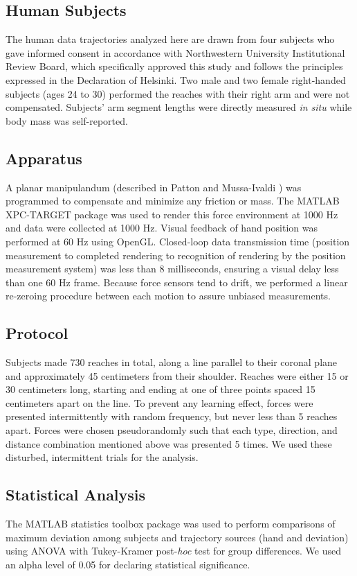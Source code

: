 \documentclass[10pt]{article}
\begin{document}
\subsection*{Human Subjects}
The human data trajectories analyzed here are drawn from four subjects who gave informed consent in accordance with Northwestern University Institutional Review Board, which specifically approved this study and follows the principles expressed in the Declaration of Helsinki. Two male and two female right-handed subjects (ages 24 to 30) performed the reaches with their right arm and were not compensated. Subjects' arm segment lengths were directly measured \textit{in situ} while body mass was self-reported. 

\subsection*{Apparatus}
A planar manipulandum (described in Patton and Mussa-Ivaldi \cite{patton2004robot}) was programmed to compensate and minimize any friction or mass. The MATLAB XPC-TARGET package \cite{MATLAB:2008} was used to render this force environment at 1000 Hz and data were collected at 1000 Hz.  Visual feedback of hand position was performed at 60 Hz using OpenGL. Closed-loop data transmission time (position measurement to completed rendering to recognition of rendering by the position measurement system) was less than 8 milliseconds, ensuring a visual delay less than one 60 Hz frame. Because force sensors tend to drift, we performed a linear re-zeroing procedure between each motion to assure unbiased measurements. 

\subsection*{Protocol}
Subjects made 730 reaches in total, along a line parallel to their coronal plane and approximately 45 centimeters from their shoulder. Reaches were either 15 or 30 centimeters long, starting and ending at one of three points spaced 15 centimeters apart on the line. To prevent any learning effect, forces were presented intermittently with random frequency, but never less than 5 reaches apart. Forces were chosen pseudorandomly such that each type, direction, and distance combination mentioned above was presented 5 times. We used these disturbed, intermittent trials for the analysis. 

\subsection*{Statistical Analysis}
The MATLAB statistics toolbox package \cite{MATLAB:2008} was used to perform comparisons of maximum deviation among subjects and trajectory sources (hand and deviation) using ANOVA with Tukey-Kramer post-\textit{hoc} test for group differences. We used an alpha level of 0.05 for declaring statistical significance.
\end{document}
